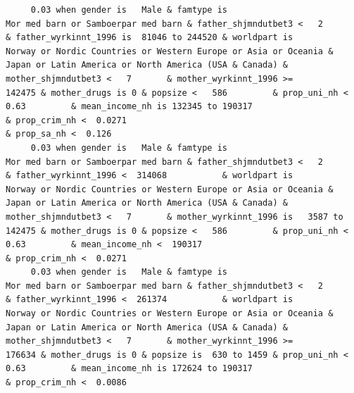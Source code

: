 \documentclass[
  letterpaper,
  DIV=11,
  numbers=noendperiod]{scrreprt}
\begin{document}
\begin{verbatim}
     0.03 when gender is   Male & famtype is                              Mor med barn or Samboerpar med barn & father_shjmndutbet3 <   2       & father_wyrkinnt_1996 is  81046 to 244520 & worldpart is            Norway or Nordic Countries or Western Europe or Asia or Oceania & Japan or Latin America or North America (USA & Canada) & mother_shjmndutbet3 <   7       & mother_wyrkinnt_1996 >=           142475 & mother_drugs is 0 & popsize <   586         & prop_uni_nh <  0.63         & mean_income_nh is 132345 to 190317                              & prop_crim_nh <  0.0271                                                                                                                  & prop_sa_nh <  0.126                                                                                                                                               
     0.03 when gender is   Male & famtype is                              Mor med barn or Samboerpar med barn & father_shjmndutbet3 <   2       & father_wyrkinnt_1996 <  314068           & worldpart is            Norway or Nordic Countries or Western Europe or Asia or Oceania & Japan or Latin America or North America (USA & Canada) & mother_shjmndutbet3 <   7       & mother_wyrkinnt_1996 is   3587 to 142475 & mother_drugs is 0 & popsize <   586         & prop_uni_nh <  0.63         & mean_income_nh <  190317                                        & prop_crim_nh <  0.0271                                                                                                                                                                                                                                                                                      
     0.03 when gender is   Male & famtype is                              Mor med barn or Samboerpar med barn & father_shjmndutbet3 <   2       & father_wyrkinnt_1996 <  261374           & worldpart is            Norway or Nordic Countries or Western Europe or Asia or Oceania & Japan or Latin America or North America (USA & Canada) & mother_shjmndutbet3 <   7       & mother_wyrkinnt_1996 >=           176634 & mother_drugs is 0 & popsize is  630 to 1459 & prop_uni_nh <  0.63         & mean_income_nh is 172624 to 190317                              & prop_crim_nh <  0.0086                                                                                                                                                                                                                                                                                      

\end{verbatim}
\end{document}
